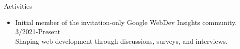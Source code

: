 \documentclass{resume} %
\begin{document}
\begin{rSection}{Activities}
  \itemsep -1pt {} 
  \begin{itemize}
    \itemsep -7pt {} 
    \item Initial member of the invitation-only Google WebDev Insights community. \hfill 3/2021-Present \\Shaping web development through discussions, surveys, and interviews.
  \end{itemize}
\end{rSection}
\end{document}
